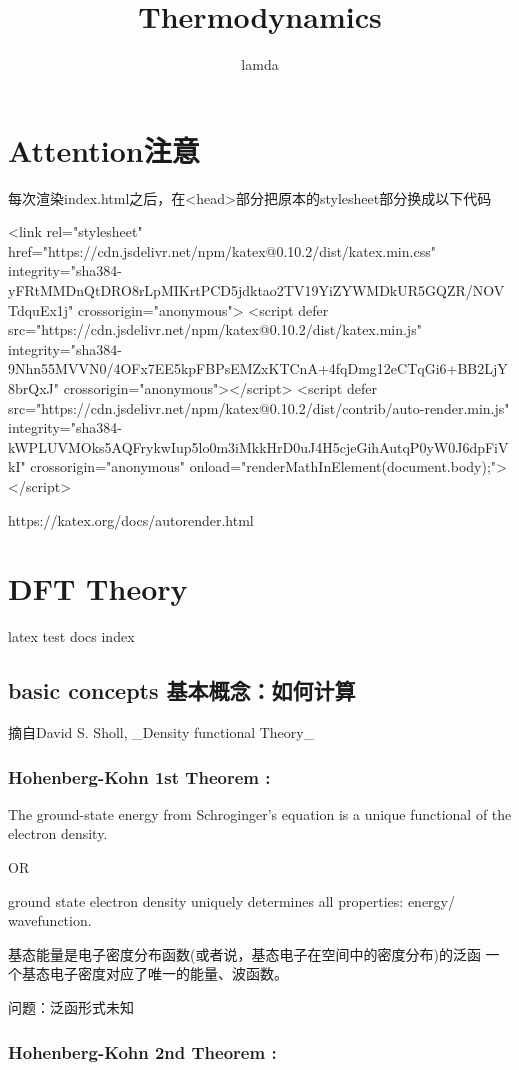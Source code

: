\documentclass{article}
\title{Thermodynamics}
\author{lamda}
\begin{document}
\section{Attention注意}

每次渲染index.html之后，在<head>部分把原本的stylesheet部分换成以下代码


<link rel="stylesheet" href="https://cdn.jsdelivr.net/npm/katex@0.10.2/dist/katex.min.css" integrity="sha384-yFRtMMDnQtDRO8rLpMIKrtPCD5jdktao2TV19YiZYWMDkUR5GQZR/NOVTdquEx1j" crossorigin="anonymous">
<script defer src="https://cdn.jsdelivr.net/npm/katex@0.10.2/dist/katex.min.js" integrity="sha384-9Nhn55MVVN0/4OFx7EE5kpFBPsEMZxKTCnA+4fqDmg12eCTqGi6+BB2LjY8brQxJ" crossorigin="anonymous"></script>
<script defer src="https://cdn.jsdelivr.net/npm/katex@0.10.2/dist/contrib/auto-render.min.js" integrity="sha384-kWPLUVMOks5AQFrykwIup5lo0m3iMkkHrD0uJ4H5cjeGihAutqP0yW0J6dpFiVkI" crossorigin="anonymous" onload="renderMathInElement(document.body);"></script>


https://katex.org/docs/autorender.html

\section{DFT Theory}
 latex test docs index


\subsection {basic concepts 基本概念：如何计算}
摘自David S. Sholl, _Density functional Theory_

\subsubsection {Hohenberg-Kohn 1st Theorem :}

The ground-state energy from Schroginger's equation is a unique functional of the electron density.

OR

ground state electron density uniquely determines all properties: energy/ wavefunction.

基态能量是电子密度分布函数(或者说，基态电子在空间中的密度分布)的泛函
一个基态电子密度对应了唯一的能量、波函数。

问题：泛函形式未知

\subsubsection {Hohenberg-Kohn 2nd Theorem :}
\end{document}
